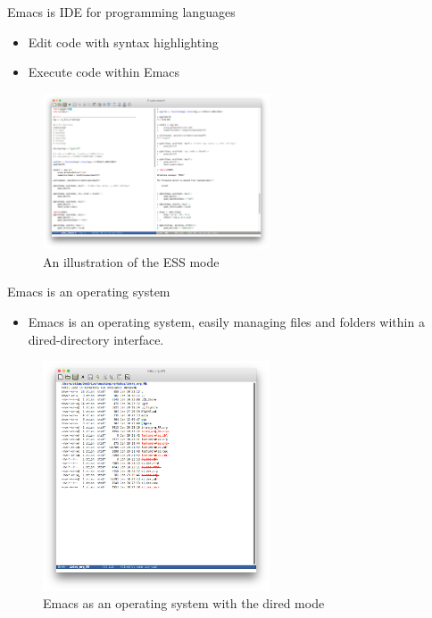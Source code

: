 \documentclass[presentation]{beamer}
\begin{document}
\begin{frame}[label={sec:orgcdc443e}]{Emacs is IDE for programming languages}
\begin{itemize}
\item Edit code with syntax highlighting
\item Execute code within Emacs
\end{itemize}

\begin{figure}[htbp]
\centering
\includegraphics[width=0.6\textwidth]{figure/r_example.png}
\caption{An illustration of the ESS mode}
\end{figure}
\end{frame}

\begin{frame}[label={sec:org3deb4c3}]{Emacs is an operating system}
\begin{itemize}
\item Emacs is an operating system, easily managing files and folders
within a dired-directory interface.
\end{itemize}

\begin{figure}[htbp]
\centering
\includegraphics[width=0.6\textwidth,height=0.6\textheight]{figure/dired_example.png}
\caption{Emacs as an operating system with the dired mode}
\end{figure}
\end{frame}
\end{document}
